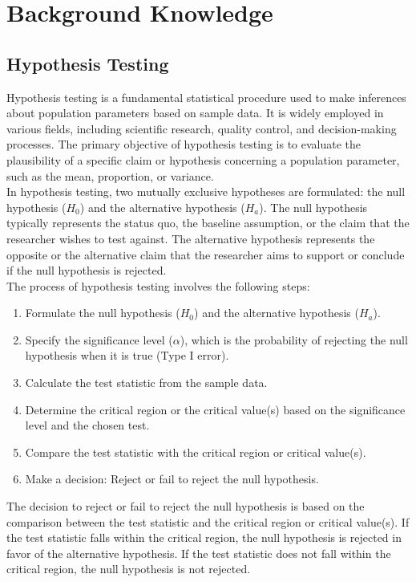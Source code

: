 \section{Background Knowledge}
\subsection{Hypothesis Testing}
Hypothesis testing is a fundamental statistical procedure used to make inferences about population parameters based on sample data. It is widely employed in various fields, including scientific research, quality control, and decision-making processes. The primary objective of hypothesis testing is to evaluate the plausibility of a specific claim or hypothesis concerning a population parameter, such as the mean, proportion, or variance.\\

In hypothesis testing, two mutually exclusive hypotheses are formulated: the null hypothesis ($H_0$) and the alternative hypothesis ($H_a$). The null hypothesis typically represents the status quo, the baseline assumption, or the claim that the researcher wishes to test against. The alternative hypothesis represents the opposite or the alternative claim that the researcher aims to support or conclude if the null hypothesis is rejected.\\

The process of hypothesis testing involves the following steps:
\begin{enumerate}
    \item Formulate the null hypothesis ($H_0$) and the alternative hypothesis ($H_a$).
    \item Specify the significance level ($\alpha$), which is the probability of rejecting the null hypothesis when it is true (Type I error).
    \item Calculate the test statistic from the sample data.
    \item Determine the critical region or the critical value(s) based on the significance level and the chosen test.
    \item Compare the test statistic with the critical region or critical value(s).
    \item Make a decision: Reject or fail to reject the null hypothesis.
\end{enumerate}

The decision to reject or fail to reject the null hypothesis is based on the comparison between the test statistic and the critical region or critical value(s). If the test statistic falls within the critical region, the null hypothesis is rejected in favor of the alternative hypothesis. If the test statistic does not fall within the critical region, the null hypothesis is not rejected.\\


